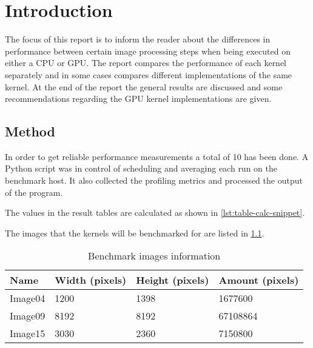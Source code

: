 \documentclass[final]{report}
\begin{document}
\chapter{Introduction}

The focus of this report is to inform the reader about the differences in performance between certain image processing steps when being executed on either a CPU or GPU.
The report compares the performance of each kernel separately and in some cases compares different implementations of the same kernel.
At the end of the report the general results are discussed and some recommendations regarding the GPU kernel implementations are given.

\section{Method}
In order to get reliable performance measurements a total of 10 has been done.
A Python script was in control of scheduling and averaging each run on the benchmark host.
It also collected the profiling metrics and processed the output of the program.

The values in the result tables are calculated as shown in \cref{lst:table-calc-snippet}.


The images that the kernels will be benchmarked for are listed in \cref{tab:image-information}.

\begin{table}[H]
	\centering
	\caption{Benchmark images information}
	\label{tab:image-information}
	\begin{tabular}{llll}
		\toprule
			\textbf{Name} &\textbf{Width (pixels)} & \textbf{Height (pixels)} & \textbf{Amount (pixels)}\\
		\midrule
			Image04 & 1200				& 1398				& 1677600 \\
			Image09 & 8192 				& 8192 				& 67108864 \\
			Image15 & 3030 				& 2360 				& 7150800\\
		\bottomrule
	\end{tabular}
\end{table}

\end{document}
